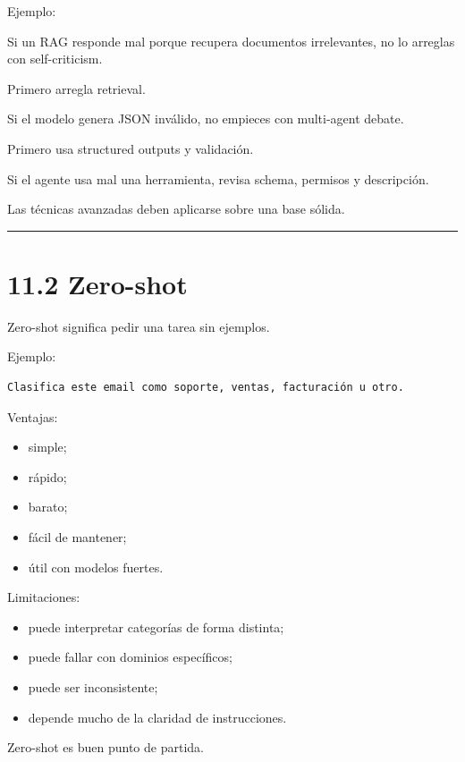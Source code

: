 Ejemplo:

Si un RAG responde mal porque recupera documentos irrelevantes, no lo
arreglas con self-criticism.

Primero arregla retrieval.

Si el modelo genera JSON inválido, no empieces con multi-agent debate.

Primero usa structured outputs y validación.

Si el agente usa mal una herramienta, revisa schema, permisos y
descripción.

Las técnicas avanzadas deben aplicarse sobre una base sólida.

\begin{center}\rule{0.5\linewidth}{0.5pt}\end{center}

\section{11.2 Zero-shot}\label{zero-shot}

Zero-shot significa pedir una tarea sin ejemplos.

Ejemplo:

\begin{lstlisting}
Clasifica este email como soporte, ventas, facturación u otro.
\end{lstlisting}

Ventajas:

\begin{itemize}
\tightlist
\item
  simple;
\item
  rápido;
\item
  barato;
\item
  fácil de mantener;
\item
  útil con modelos fuertes.
\end{itemize}

Limitaciones:

\begin{itemize}
\tightlist
\item
  puede interpretar categorías de forma distinta;
\item
  puede fallar con dominios específicos;
\item
  puede ser inconsistente;
\item
  depende mucho de la claridad de instrucciones.
\end{itemize}

Zero-shot es buen punto de partida.

